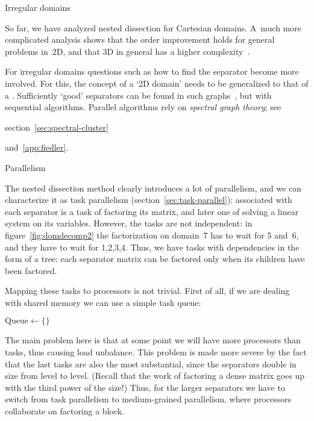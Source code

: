  {Irregular domains}

So far, we have analyzed nested dissection for Cartesian domains.
A~much more complicated analysis shows that the
order improvement holds for general problems in~2D, and that 3D in
general has a higher
complexity~\cite{LiRoTa:dissection}.

For irregular domains questions such as how to find the separator become more involved.
For this, the concept of a `2D domain' needs to be generalized
to that of a .
Sufficiently `good' separators can be found in such graphs~\cite{LiTa:separator},
but with sequential algorithms.
Parallel algorithms rely on
\emph{spectral graph theory};
see
\begin{notready}
section~\ref{sec:spectral-cluster}
\end{notready}
and~\ref{app:fiedler}.

 {Parallelism}
\label{sec:dissect-parallel}

The nested dissection method clearly introduces a lot of parallelism,
and we can characterize it as task parallelism
(section~\ref{sec:task-parallel}): associated with each separator is a
task of factoring its matrix, and later one of solving a linear system
on its variables.  However, the tasks are not independent: in
figure~\ref{fig:domdecomp2} the factorization on domain~7 has to wait
for 5 and~6, and they have to wait for 1,2,3,4.
Thus, we have tasks with dependencies in the form of a tree: each
separator matrix can be factored only when its children have been
factored.

Mapping these tasks to processors is not trivial. First of all, if we
are dealing with shared memory we can use a simple task queue:

\begin{displayalgorithm}
  \label{fig:taskqueue}
  $\mbox{Queue}\leftarrow\{\}$\;
        {
        }
\end{displayalgorithm}

The main problem here is that at some point we will have more
processors than tasks, thus causing load unbalance. This problem is
made more severe by the fact that the last tasks are also the most
substantial, since the separators double in size from level to
level. (Recall that the work of factoring a dense matrix goes up with the
third power of the size!) Thus, for the larger separators we have to
switch from task parallelism to medium-grained parallelism, where
processors collaborate on factoring a block.

